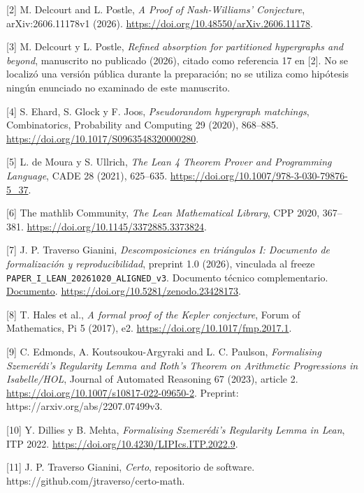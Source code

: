 \documentclass[spanish,11pt,a4paper]{article}
\begin{document}
{[}2{]} M. Delcourt and L. Postle, \emph{A Proof of Nash-Williams' Conjecture}, arXiv:2606.11178v1 (2026). \url{https://doi.org/10.48550/arXiv.2606.11178}.

{[}3{]} M. Delcourt y L. Postle, \emph{Refined absorption for partitioned hypergraphs and beyond}, manuscrito no publicado (2026), citado como referencia 17 en {[}2{]}. No se localizó una versión pública durante la preparación; no se utiliza como hipótesis ningún enunciado no examinado de este manuscrito.

{[}4{]} S. Ehard, S. Glock y F. Joos, \emph{Pseudorandom hypergraph matchings}, Combinatorics, Probability and Computing 29 (2020), 868--885. \url{https://doi.org/10.1017/S0963548320000280}.

{[}5{]} L. de Moura y S. Ullrich, \emph{The Lean 4 Theorem Prover and Programming Language}, CADE 28 (2021), 625--635. \url{https://doi.org/10.1007/978-3-030-79876-5_37}.

{[}6{]} The mathlib Community, \emph{The Lean Mathematical Library}, CPP 2020, 367--381. \url{https://doi.org/10.1145/3372885.3373824}.

{[}7{]} J. P. Traverso Gianini, \emph{Descomposiciones en triángulos I: Documento de formalización y reproducibilidad}, preprint 1.0 (2026), vinculada al freeze \texttt{PAPER\_\allowbreak{}I\_\allowbreak{}LEAN\_\allowbreak{}20261020\_\allowbreak{}ALIGNED\_\allowbreak{}v3}. Documento técnico complementario. \href{https://github.com/jtraverso/nash-williams-triangle-decompositions-release/blob/main/preprints/PAPER_I/05_formalization/FORMALIZATION_COMPANION_preprint_v1.0_es.md}{Documento}. \url{https://doi.org/10.5281/zenodo.23428173}.

{[}8{]} T. Hales et al., \emph{A formal proof of the Kepler conjecture}, Forum of Mathematics, Pi 5 (2017), e2. \url{https://doi.org/10.1017/fmp.2017.1}.

{[}9{]} C. Edmonds, A. Koutsoukou-Argyraki and L. C. Paulson, \emph{Formalising Szemerédi's Regularity Lemma and Roth's Theorem on Arithmetic Progressions in Isabelle/HOL}, Journal of Automated Reasoning 67 (2023), article 2. \url{https://doi.org/10.1007/s10817-022-09650-2}. Preprint: https://arxiv.org/abs/2207.07499v3.

{[}10{]} Y. Dillies y B. Mehta, \emph{Formalising Szemerédi's Regularity Lemma in Lean}, ITP 2022. \url{https://doi.org/10.4230/LIPIcs.ITP.2022.9}.

{[}11{]} J. P. Traverso Gianini, \emph{Certo}, repositorio de software. https://github.com/jtraverso/certo-math.
\end{document}
